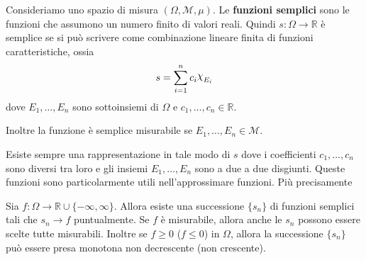 \begin{definition}
Consideriamo uno spazio di misura \((\Omega, \mathcal{M}, \mu)\). Le
\textbf{funzioni semplici}
sono le funzioni che assumono un numero finito di valori reali. Quindi
\(s : \Omega \to  \mathbb{R}\) è semplice se si può scrivere come combinazione
lineare finita di funzioni caratteristiche, ossia
\[
    s = \sum_{i=1}^{n} c_{i} \rchi_{E_{i}}
\]
dove \(E_{1}, \dots, E_{n}\) sono sottoinsiemi di \(\Omega\) e \(c_{1}, \dots,
c_{n} \in \mathbb{R}\).

Inoltre la funzione è semplice misurabile se \(E_{1}, \dots, E_{n} \in
\mathcal{M}\).
\end{definition}
Esiste sempre una rappresentazione in tale modo di \(s\) dove i coefficienti
\(c_{1}, \dots, c_{n}\) sono diversi tra loro e gli insiemi \(E_{1}, \dots,
E_{n}\) sono a due a due disgiunti. Queste funzioni sono particolarmente utili
nell'approssimare funzioni. Più precisamente
\begin{proposition}\label{prop:esistenza_semplici}
    Sia \(f : \Omega \to  \mathbb{R} \cup \{-\infty, \infty\} \). Allora esiste
    una successione \(\{s_{n}\} \) di funzioni semplici tali che \(s_{n} \to f\)
    puntualmente. Se \(f\) è misurabile, allora anche le \(s_{n}\) possono
    essere scelte tutte misurabili. Inoltre se \(f \ge 0\) (\(f \le 0\)) in \(\Omega\), allora
    la successione \(\{s_{n}\} \) può essere presa monotona non decrescente (non
    crescente).
\end{proposition}
